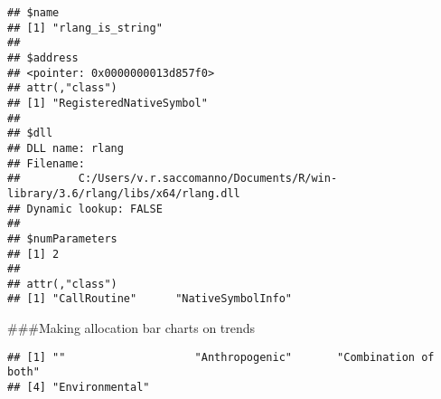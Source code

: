 \documentclass[
]{article}
\newenvironment{Shaded}{\begin{snugshade}}{\end{snugshade}}
\newcommand{\CommentTok}[1]{\textcolor[rgb]{0.56,0.35,0.01}{\textit{#1}}}
\newcommand{\KeywordTok}[1]{\textcolor[rgb]{0.13,0.29,0.53}{\textbf{#1}}}
\newcommand{\NormalTok}[1]{#1}
\newcommand{\OperatorTok}[1]{\textcolor[rgb]{0.81,0.36,0.00}{\textbf{#1}}}
\newcommand{\StringTok}[1]{\textcolor[rgb]{0.31,0.60,0.02}{#1}}
\begin{document}
\begin{verbatim}
## $name
## [1] "rlang_is_string"
## 
## $address
## <pointer: 0x0000000013d857f0>
## attr(,"class")
## [1] "RegisteredNativeSymbol"
## 
## $dll
## DLL name: rlang
## Filename:
##         C:/Users/v.r.saccomanno/Documents/R/win-library/3.6/rlang/libs/x64/rlang.dll
## Dynamic lookup: FALSE
## 
## $numParameters
## [1] 2
## 
## attr(,"class")
## [1] "CallRoutine"      "NativeSymbolInfo"
\end{verbatim}

\#\#\#Making allocation bar charts on trends

\begin{Shaded}
\end{Shaded}

\begin{verbatim}
## [1] ""                    "Anthropogenic"       "Combination of both"
## [4] "Environmental"
\end{verbatim}
\end{document}
